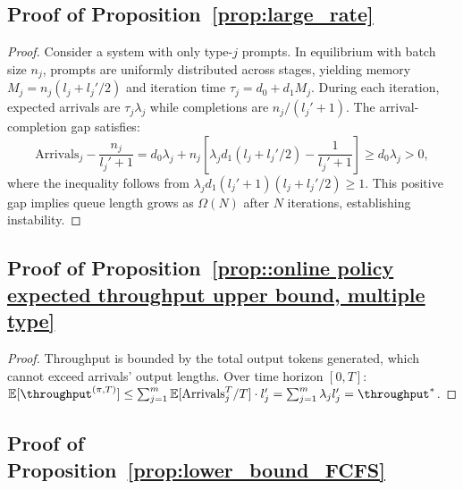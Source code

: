 \subsection{Proof of Proposition~\ref{prop:large_rate}}
\label{appendix:proof_large_rate}

\begin{proof}
Consider a system with only type-$j$ prompts. In equilibrium with batch size $n_j$, prompts are uniformly distributed across stages, yielding memory $M_j = n_j(l_j + l_j'/2)$ and iteration time $\tau_j = d_0 + d_1 M_j$. During each iteration, expected arrivals are $\tau_j \lambda_j$ while completions are $n_j/(l_j'+1)$. The arrival-completion gap satisfies:
$$\text{Arrivals}_j - \frac{n_j}{l_j'+1} = d_0\lambda_j + n_j\left[\lambda_j d_1 (l_j + l_j'/2) - \frac{1}{l_j'+1}\right] \geq d_0\lambda_j > 0,$$
where the inequality follows from $\lambda_j d_1 (l_j'+1)(l_j + l_j'/2) \geq 1$. This positive gap implies queue length grows as $\Omega(N)$ after $N$ iterations, establishing instability.
\end{proof}

\subsection{Proof of Proposition~\ref{prop::online policy expected throughput upper bound, multiple type}}
\label{appendix:proof_throughput_upper_bound}

\begin{proof}
Throughput is bounded by the total output tokens generated, which cannot exceed arrivals' output lengths. Over time horizon $[0,T]$: $\mathbb{E}[\throughput^{(\pi,T)}] \leq \sum_{j=1}^m \mathbb{E}[\text{Arrivals}_j^T/T] \cdot l_j' = \sum_{j=1}^m \lambda_j l_j' = \throughput^*$.
\end{proof}

\subsection{Proof of Proposition~\ref{prop:lower_bound_FCFS}}
\label{appendix:proof_fcfs_lower_bound}

